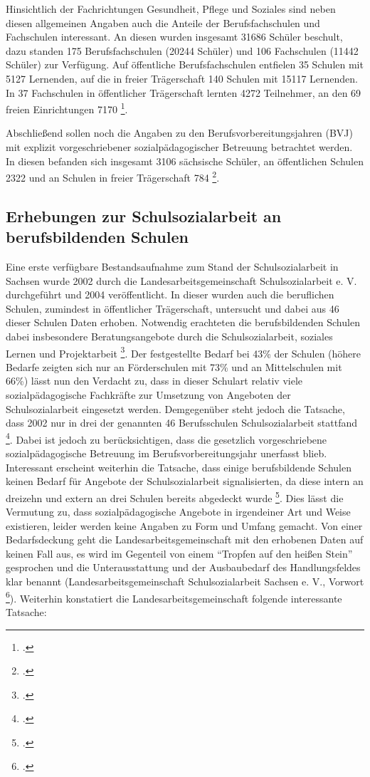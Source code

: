 Hinsichtlich der Fachrichtungen Gesundheit, Pflege und Soziales sind neben diesen allgemeinen Angaben auch die Anteile der Berufsfachschulen und Fachschulen interessant. An diesen wurden insgesamt 31686 Schüler beschult, dazu standen 175 Berufsfachschulen (20244 Schüler) und 106 Fachschulen (11442 Schüler) zur Verfügung. Auf öffentliche Berufsfachschulen entfielen 35 Schulen mit 5127 Lernenden, auf die in freier Trägerschaft 140 Schulen mit 15117 Lernenden. In 37 Fachschulen in öffentlicher Trägerschaft lernten 4272 Teilnehmer, an den 69 freien Einrichtungen 7170 \footcite[vgl.][286ff]{SLFS2015}. 

Abschließend sollen noch die Angaben zu den Berufsvorbereitungsjahren (BVJ) mit explizit vorgeschriebener sozialpädagogischer Betreuung betrachtet werden. In diesen befanden sich insgesamt 3106 sächsische Schüler, an öffentlichen Schulen 2322 und an Schulen in freier Trägerschaft 784 \footcite[vgl.][286ff]{SLFS2015}. 

\subsection{Erhebungen zur Schulsozialarbeit an berufsbildenden Schulen}
\label{sec:ErhebungenZurSchulsozialarbeitAnBerufsbildendenSchulen}

Eine erste verfügbare Bestandsaufnahme zum Stand der Schulsozialarbeit in Sachsen wurde 2002 durch die Landesarbeitsgemeinschaft Schulsozialarbeit e. V. durchgeführt und 2004 veröffentlicht. In dieser wurden auch die beruflichen Schulen, zumindest in öffentlicher Trägerschaft, untersucht und dabei aus 46 dieser Schulen Daten erhoben. Notwendig erachteten die berufsbildenden Schulen dabei insbesondere Beratungsangebote durch die Schulsozialarbeit, soziales Lernen und Projektarbeit \footcite[vgl.][6ff]{LSS2004}. Der festgestellte Bedarf bei 43\% der Schulen (höhere Bedarfe zeigten sich nur an Förderschulen mit 73\% und an Mittelschulen mit 66\%) lässt nun den Verdacht zu, dass in dieser Schulart relativ viele sozialpädagogische Fachkräfte zur Umsetzung von Angeboten der Schulsozialarbeit eingesetzt werden. Demgegenüber steht jedoch die Tatsache, dass 2002 nur in drei der genannten 46 Berufsschulen Schulsozialarbeit stattfand \footcite[vgl.][6ff]{LSS2004}. Dabei ist jedoch zu berücksichtigen, dass die gesetzlich vorgeschriebene sozialpädagogische Betreuung im Berufsvorbereitungsjahr unerfasst blieb. Interessant erscheint weiterhin die Tatsache, dass einige berufsbildende Schulen keinen Bedarf für Angebote der Schulsozialarbeit signalisierten, da diese intern an dreizehn und extern an drei Schulen bereits abgedeckt wurde \footcite[vgl.][5]{LSS2004}. Dies lässt die Vermutung zu, dass sozialpädagogische Angebote in irgendeiner Art und Weise existieren, leider werden keine Angaben zu Form und Umfang gemacht. Von einer Bedarfsdeckung geht die Landesarbeitsgemeinschaft mit den erhobenen Daten auf keinen Fall aus, es wird im Gegenteil von einem "`Tropfen auf den heißen Stein"' gesprochen und die Unterausstattung und der Ausbaubedarf des Handlungsfeldes klar benannt (Landesarbeitsgemeinschaft Schulsozialarbeit Sachsen e. V., Vorwort \footcite[vgl.]{LSS2004}). Weiterhin konstatiert die Landesarbeitsgemeinschaft folgende interessante Tatsache: 

